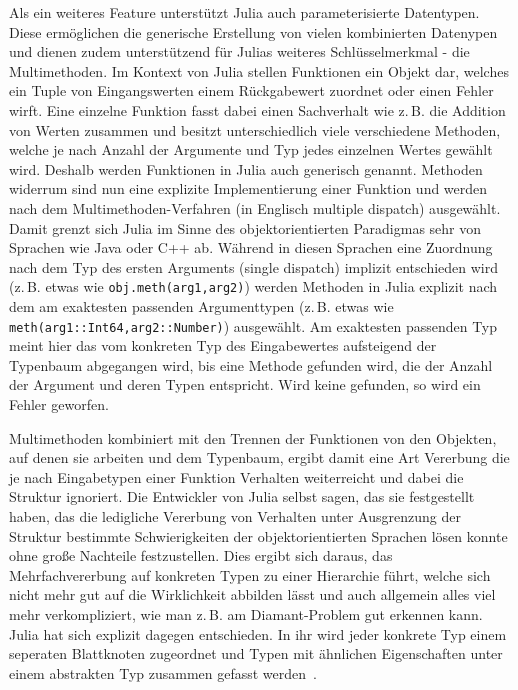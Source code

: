\documentclass[proseminar,german,utf8]{zihpub}
\newcommand{\zB}[0]{{z.\,B. }}
\begin{document}
Als ein weiteres Feature unterstützt Julia auch parameterisierte Datentypen. Diese ermöglichen die generische Erstellung von vielen kombinierten Datenypen und dienen zudem unterstützend für Julias weiteres Schlüsselmerkmal - die Multimethoden. Im Kontext von Julia stellen Funktionen ein Objekt dar, welches ein Tuple von Eingangswerten einem Rückgabewert zuordnet oder einen Fehler wirft. Eine einzelne Funktion fasst dabei einen Sachverhalt wie \zB die Addition von Werten zusammen und besitzt unterschiedlich viele verschiedene Methoden, welche je nach Anzahl der Argumente und Typ jedes einzelnen Wertes gewählt wird. Deshalb werden Funktionen in Julia auch generisch genannt. Methoden widerrum sind nun eine explizite Implementierung einer Funktion und werden nach dem Multimethoden-Verfahren (in Englisch multiple dispatch) ausgewählt. Damit grenzt sich Julia im Sinne des objektorientierten Paradigmas sehr von Sprachen wie Java oder C++ ab. Während in diesen Sprachen eine Zuordnung nach dem Typ des ersten Arguments (single dispatch) implizit entschieden wird (\zB etwas wie \verb|obj.meth(arg1,arg2)|) werden Methoden in Julia explizit nach dem am exaktesten passenden Argumenttypen (\zB etwas wie \verb|meth(arg1::Int64,arg2::Number)|) ausgewählt. Am exaktesten passenden Typ meint hier das vom konkreten Typ des Eingabewertes aufsteigend der Typenbaum abgegangen wird, bis eine Methode gefunden wird, die der Anzahl der Argument und deren Typen entspricht. Wird keine gefunden, so wird ein Fehler geworfen. 

Multimethoden kombiniert mit den Trennen der Funktionen von den Objekten, auf denen sie arbeiten und dem Typenbaum, ergibt damit eine Art Vererbung die je nach Eingabetypen einer Funktion Verhalten weiterreicht und dabei die Struktur ignoriert. Die Entwickler von Julia selbst sagen, das sie festgestellt haben, das die ledigliche Vererbung von Verhalten unter Ausgrenzung der Struktur bestimmte Schwierigkeiten der objektorientierten Sprachen lösen konnte ohne große Nachteile festzustellen. Dies ergibt sich daraus, das Mehrfachvererbung auf konkreten Typen zu einer Hierarchie führt, welche sich nicht mehr gut auf die Wirklichkeit abbilden lässt und auch allgemein alles viel mehr verkompliziert, wie man \zB am Diamant-Problem gut erkennen kann. Julia hat sich explizit dagegen entschieden. In ihr wird jeder konkrete Typ einem seperaten Blattknoten zugeordnet und Typen mit ähnlichen Eigenschaften unter einem abstrakten Typ zusammen gefasst werden~\cite{JuliaLangDocumentation}.
\end{document}
